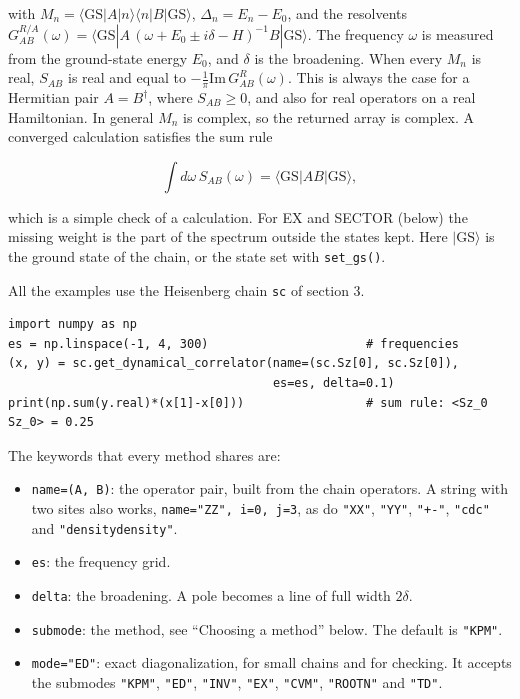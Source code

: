 \documentclass[11pt]{article}
\providecommand{\tightlist}{\setlength{\itemsep}{0pt}\setlength{\parskip}{0pt}}
\begin{document}
with \(M_n=\langle\mathrm{GS}|A|n\rangle\langle n|B|\mathrm{GS}\rangle\),
\(\Delta_n=E_n-E_0\), and the resolvents
\(G^{R/A}_{AB}(\omega)=\langle\mathrm{GS}|A\,(\omega+E_0\pm i\delta-H)^{-1}B|\mathrm{GS}\rangle\).
The frequency \(\omega\) is measured from the ground-state energy \(E_0\), and
\(\delta\) is the broadening. When every \(M_n\) is real, \(S_{AB}\) is real and
equal to \(-\frac1\pi\mathrm{Im}\,G^R_{AB}(\omega)\). This is always the case
for a Hermitian pair \(A=B^\dagger\), where \(S_{AB}\ge0\), and also for real
operators on a real Hamiltonian. In general \(M_n\) is complex, so the
returned array is complex. A converged calculation satisfies the sum rule

\[\int d\omega\,S_{AB}(\omega)=\langle\mathrm{GS}|AB|\mathrm{GS}\rangle,\]

which is a simple check of a calculation. For EX and SECTOR (below) the
missing weight is the part of the spectrum outside the states kept. Here \(|\mathrm{GS}\rangle\) is the
ground state of the chain, or the state set with \texttt{set\_\allowbreak{}gs()}.

All the examples use the Heisenberg chain \texttt{sc} of section 3.

\begin{lstlisting}
import numpy as np
es = np.linspace(-1, 4, 300)                      # frequencies
(x, y) = sc.get_dynamical_correlator(name=(sc.Sz[0], sc.Sz[0]),
                                     es=es, delta=0.1)
print(np.sum(y.real)*(x[1]-x[0]))                 # sum rule: <Sz_0 Sz_0> = 0.25
\end{lstlisting}

The keywords that every method shares are:

\begin{itemize}
\tightlist
\item
  \texttt{name=(A,\ B)}: the operator pair, built from the chain operators. A
  string with two sites also works, \texttt{name="ZZ",\ i=0,\ j=3}, as do \texttt{"XX"},
  \texttt{"YY"}, \texttt{"+-"}, \texttt{"cdc"} and \texttt{"densitydensity"}.
\item
  \texttt{es}: the frequency grid.
\item
  \texttt{delta}: the broadening. A pole becomes a line of full width \(2\delta\).
\item
  \texttt{submode}: the method, see ``Choosing a method'' below. The default is
  \texttt{"KPM"}.
\item
  \texttt{mode="ED"}: exact diagonalization, for small chains and for checking.
  It accepts the submodes \texttt{"KPM"}, \texttt{"ED"}, \texttt{"INV"}, \texttt{"EX"}, \texttt{"CVM"},
  \texttt{"ROOTN"} and \texttt{"TD"}.
\end{itemize}
\end{document}
